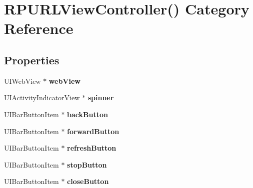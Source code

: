 \hypertarget{category_r_p_u_r_l_view_controller_07_08}{\section{R\-P\-U\-R\-L\-View\-Controller() Category Reference}
\label{category_r_p_u_r_l_view_controller_07_08}
}
\subsection*{Properties}
\begin{DoxyCompactItemize}
\item 
\hypertarget{category_r_p_u_r_l_view_controller_07_08_ae7fd3751b2c2a8c8b32693f2e5d1c6f8}{U\-I\-Web\-View $\ast$ {\bfseries web\-View}}\label{category_r_p_u_r_l_view_controller_07_08_ae7fd3751b2c2a8c8b32693f2e5d1c6f8}

\item 
\hypertarget{category_r_p_u_r_l_view_controller_07_08_ad6eea32eb84b701911026abe375ca7be}{U\-I\-Activity\-Indicator\-View $\ast$ {\bfseries spinner}}\label{category_r_p_u_r_l_view_controller_07_08_ad6eea32eb84b701911026abe375ca7be}

\item 
\hypertarget{category_r_p_u_r_l_view_controller_07_08_a695ca3b93ce2e915a0da6cbb388619b5}{U\-I\-Bar\-Button\-Item $\ast$ {\bfseries back\-Button}}\label{category_r_p_u_r_l_view_controller_07_08_a695ca3b93ce2e915a0da6cbb388619b5}

\item 
\hypertarget{category_r_p_u_r_l_view_controller_07_08_ad5a0bfea5cd75a394396fdc1377e697f}{U\-I\-Bar\-Button\-Item $\ast$ {\bfseries forward\-Button}}\label{category_r_p_u_r_l_view_controller_07_08_ad5a0bfea5cd75a394396fdc1377e697f}

\item 
\hypertarget{category_r_p_u_r_l_view_controller_07_08_a2207a374f05e0cd90e90f58a7f71f0b9}{U\-I\-Bar\-Button\-Item $\ast$ {\bfseries refresh\-Button}}\label{category_r_p_u_r_l_view_controller_07_08_a2207a374f05e0cd90e90f58a7f71f0b9}

\item 
\hypertarget{category_r_p_u_r_l_view_controller_07_08_a654380480b98257c381e93d94a8db40f}{U\-I\-Bar\-Button\-Item $\ast$ {\bfseries stop\-Button}}\label{category_r_p_u_r_l_view_controller_07_08_a654380480b98257c381e93d94a8db40f}

\item 
\hypertarget{category_r_p_u_r_l_view_controller_07_08_a4820b9b357c3096697c79790b4c84ff5}{U\-I\-Bar\-Button\-Item $\ast$ {\bfseries close\-Button}}\label{category_r_p_u_r_l_view_controller_07_08_a4820b9b357c3096697c79790b4c84ff5}

\end{DoxyCompactItemize}
